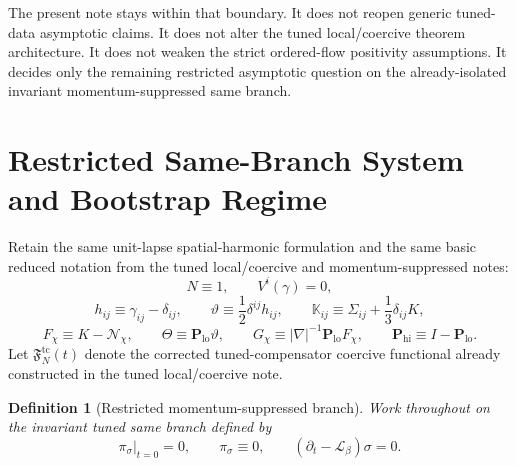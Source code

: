 \documentclass[11pt]{article}
\newcommand{\Ell}{\mathcal{L}}
\newtheorem{definition}{Definition}
\begin{document}
The present note stays within that boundary. It does not reopen generic tuned-data asymptotic claims. It does not alter the tuned local/coercive theorem architecture. It does not weaken the strict ordered-flow positivity assumptions. It decides only the remaining restricted asymptotic question on the already-isolated invariant momentum-suppressed same branch.

\section{Restricted Same-Branch System and Bootstrap Regime}

Retain the same unit-lapse spatial-harmonic formulation and the same basic reduced notation from the tuned local/coercive and momentum-suppressed notes:
\begin{equation}
N\equiv 1,
\qquad
V^i(\gamma)=0,
\label{eq:gauge}
\end{equation}
\begin{equation}
h_{ij}\equiv \gamma_{ij}-\delta_{ij},
\qquad
\vartheta\equiv \frac12\delta^{ij}h_{ij},
\qquad
\mathbb K_{ij}\equiv \Sigma_{ij}+\frac13\delta_{ij}K,
\label{eq:hkdefs}
\end{equation}
\begin{equation}
F_\chi
\equiv
K-\mathcal N_\chi,
\qquad
\Theta\equiv \mathbf P_{\mathrm{lo}}\vartheta,
\qquad
G_\chi\equiv |\nabla|^{-1}\mathbf P_{\mathrm{lo}}F_\chi,
\qquad
\mathbf P_{\mathrm{hi}}\equiv I-\mathbf P_{\mathrm{lo}}.
\label{eq:ThetaG}
\end{equation}
Let \(\mathfrak F_N^{\mathrm{tc}}(t)\) denote the corrected tuned-compensator coercive functional already constructed in the tuned local/coercive note.

\begin{definition}[Restricted momentum-suppressed branch]
\label{def:branch}
Work throughout on the invariant tuned same branch defined by
\begin{equation}
\pi_\sigma|_{t=0}=0,
\qquad
\pi_\sigma\equiv 0,
\qquad
(\partial_t-\Ell_\beta)\sigma=0.
\label{eq:branch}
\end{equation}
\end{definition}
\end{document}
